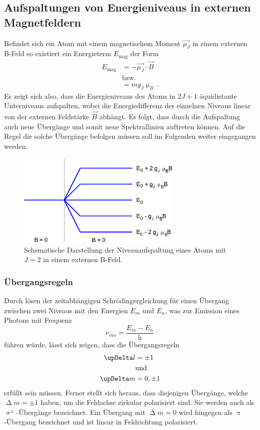 \subsection{Aufspaltungen von Energieniveaus in externen Magnetfeldern}
Befindet sich ein Atom mit einem magnetischem Moment $\vec{\mu_J}$ in einem externen B-Feld so existiert ein Energieterm $E_\text{mag}$ der Form
\begin{align}
E_\text{mag}&=-\vec{\mu_J}\cdot\vec{B}\\
&\text{bzw.}\nonumber\\
&=mg_J\upmu_B\,.
\end{align}
Es zeigt sich also, dass die Energieniveaus des Atoms in $2J+1$ äquidistante Unterniveaus aufspalten, wobei die Energiedifferenz der einzelnen Niveaus linear von der externen Feldstärke $\vec{B}$ abhängt.
Es folgt, dass durch die Aufspaltung auch neue Übergänge und somit neue Spektrallinien auftreten können. Auf die Regel die solche Übergänge befolgen müssen soll im Folgenden weiter eingegangen werden.
\begin{figure}
  \centering
  \includegraphics[width=0.7\textwidth]{Bilder/t1.png}
  \caption{Schematische Darstellung der Niveauaufspaltung eines Atoms mit $J=2$ in einem externen B-Feld.}
\end{figure}
\subsubsection{Übergangsregeln}
Durch lösen der zeitabhängigen Schrödingergleichung für einen Übergang zwischen zwei Niveaus mit den Energien $E_m$ und $E_n$, was zur Emission eines Photons mit Frequenz
\begin{equation}
\nu_{mn}=\frac{E_m-E_n}{\text{h}}\,
\end{equation}
führen würde, lässt sich zeigen, dass die Übergangsregeln
\begin{align}
\upDelta l&=\pm1\newline\\
&\text{und}\nonumber\\
\upDelta m &=0,\pm1
\end{align}
erfüllt sein müssen. Ferner stellt sich heraus, dass diejenigen Übergänge, welche $\upDelta m=\pm 1$ haben, um die Feldachse zirkular polarisiert sind. Sie werden auch als $\upsigma^\pm$-Übergänge bezeichnet. Ein Übergang mit $\upDelta m=0$ wird hingegen als $\uppi$-Übergang bezeichnet und ist linear in Feldrichtung polarisiert.
